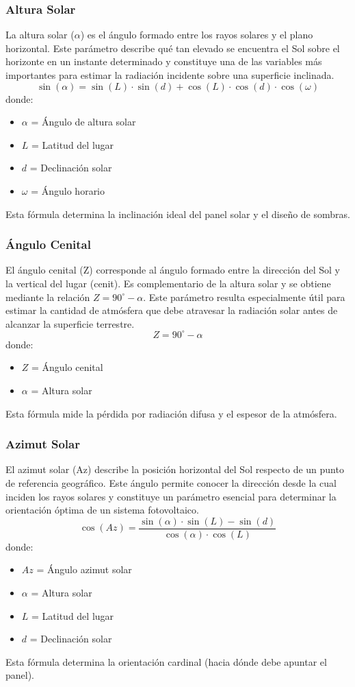 \documentclass[12pt, a4paper]{article}
\begin{document}
\subsubsection{Altura Solar}
La altura solar ($\alpha$) es el ángulo formado entre los rayos solares y el plano horizontal. Este parámetro describe qué tan elevado se encuentra el Sol sobre el horizonte en un instante determinado y constituye una de las variables más importantes para estimar la radiación incidente sobre una superficie inclinada.
\[ \sin(\alpha) = \sin(L) \cdot \sin(d) + \cos(L) \cdot \cos(d) \cdot \cos(\omega) \]
donde:
\begin{itemize}
    \item $\alpha$ = Ángulo de altura solar
    \item $L$ = Latitud del lugar
    \item $d$ = Declinación solar
    \item $\omega$ = Ángulo horario
\end{itemize}
Esta fórmula determina la inclinación ideal del panel solar y el diseño de sombras.

\subsubsection{Ángulo Cenital}
El ángulo cenital (Z) corresponde al ángulo formado entre la dirección del Sol y la vertical del lugar (cenit). Es complementario de la altura solar y se obtiene mediante la relación $Z = 90^\circ - \alpha$. Este parámetro resulta especialmente útil para estimar la cantidad de atmósfera que debe atravesar la radiación solar antes de alcanzar la superficie terrestre.
\[ Z = 90^\circ - \alpha \]
donde:
\begin{itemize}
    \item $Z$ = Ángulo cenital
    \item $\alpha$ = Altura solar
\end{itemize}
Esta fórmula mide la pérdida por radiación difusa y el espesor de la atmósfera.

\subsubsection{Azimut Solar}
El azimut solar (Az) describe la posición horizontal del Sol respecto de un punto de referencia geográfico. Este ángulo permite conocer la dirección desde la cual inciden los rayos solares y constituye un parámetro esencial para determinar la orientación óptima de un sistema fotovoltaico.
\[ \cos(Az) = \frac{\sin(\alpha) \cdot \sin(L) - \sin(d)}{\cos(\alpha) \cdot \cos(L)} \]
donde:
\begin{itemize}
    \item $Az$ = Ángulo azimut solar
    \item $\alpha$ = Altura solar
    \item $L$ = Latitud del lugar
    \item $d$ = Declinación solar
\end{itemize}
Esta fórmula determina la orientación cardinal (hacia dónde debe apuntar el panel).
\end{document}
